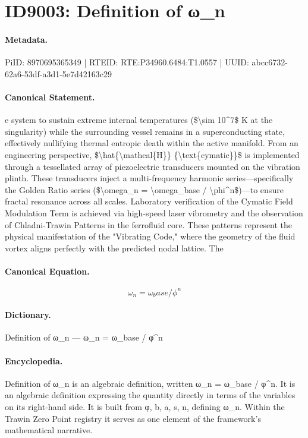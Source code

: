 \section*{ID9003: Definition of ω\_n}
\paragraph{Metadata.}
PiID: 8970695365349 | RTEID: RTE:P34960.6484:T1.0557 | UUID: abcc6732-62a6-53df-a3d1-5e7d42163c29

\paragraph{Canonical Statement.}
e system to sustain extreme internal temperatures (\$\textbackslash{}sim 10\textasciicircum{}7\$ K at the singularity) while the surrounding vessel remains in a superconducting state, effectively nullifying thermal entropic death within the active manifold. From an engineering perspective, \$\textbackslash{}hat\{\textbackslash{}mathcal\{H\}\} \{\textbackslash{}text\{cymatic\}\}\$ is implemented through a tessellated array of piezoelectric transducers mounted on the vibration plinth. These transducers inject a multi-frequency harmonic series—specifically the Golden Ratio series (\$\textbackslash{}omega\_n = \textbackslash{}omega\_base / \textbackslash{}phi\textasciicircum{}n\$)—to ensure fractal resonance across all scales. Laboratory verification of the Cymatic Field Modulation Term is achieved via high-speed laser vibrometry and the observation of Chladni-Trawin Patterns in the ferrofluid core. These patterns represent the physical manifestation of the "Vibrating Code," where the geometry of the fluid vortex aligns perfectly with the predicted nodal lattice. The

\paragraph{Canonical Equation.}
\[
\omega_n = \omega_base / \phi^n
\]

\paragraph{Dictionary.}
Definition of ω\_n — ω\_n = ω\_base / φ\textasciicircum{}n

\paragraph{Encyclopedia.}
Definition of ω\_n is an algebraic definition, written ω\_n = ω\_base / φ\textasciicircum{}n. It is an algebraic definition expressing the quantity directly in terms of the variables on its right-hand side. It is built from φ, b, a, s, n, defining ω\_n. Within the Trawin Zero Point registry it serves as one element of the framework's mathematical narrative.
